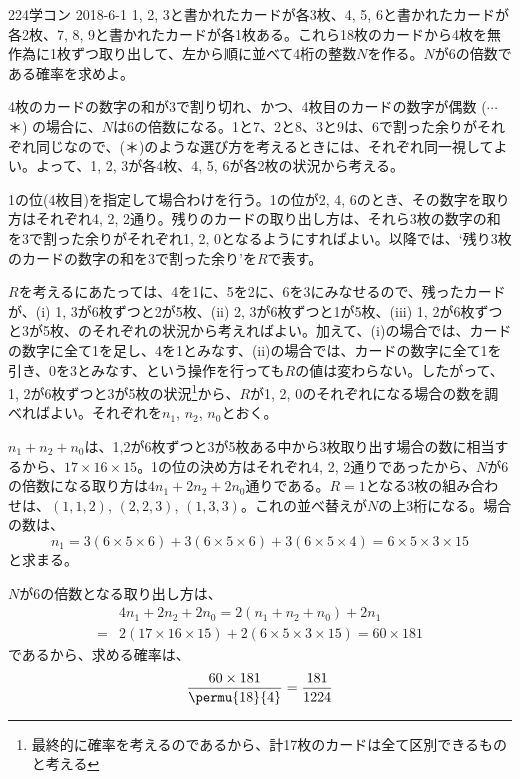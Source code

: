 \begin{prob}{224}{\maru}{学コン 2018-6-1}
 1, 2, 3と書かれたカードが各3枚、4, 5, 6と書かれたカードが各2枚、7, 8, 9と書かれたカードが各1枚ある。これら18枚のカードから4枚を無作為に1枚ずつ取り出して、左から順に並べて4桁の整数$N$を作る。$N$が6の倍数である確率を求めよ。
\end{prob}
4枚のカードの数字の和が3で割り切れ、かつ、4枚目のカードの数字が偶数 ($\cdots$ ＊) の場合に、$N$は6の倍数になる。1と7、2と8、3と9は、6で割った余りがそれぞれ同じなので、(＊)のような選び方を考えるときには、それぞれ同一視してよい。よって、1, 2, 3が各4枚、4, 5, 6が各2枚の状況から考える。

1の位(4枚目)を指定して場合わけを行う。1の位が2, 4, 6のとき、その数字を取り方はそれぞれ4, 2, 2通り。残りのカードの取り出し方は、それら3枚の数字の和を3で割った余りがそれぞれ1, 2, 0となるようにすればよい。以降では、`残り3枚のカードの数字の和を3で割った余り'を$R$で表す。

$R$を考えるにあたっては、4を1に、5を2に、6を3にみなせるので、残ったカードが、(i) 1, 3が6枚ずつと2が5枚、(ii) 2, 3が6枚ずつと1が5枚、(iii) 1, 2が6枚ずつと3が5枚、のそれぞれの状況から考えればよい。加えて、(i)の場合では、カードの数字に全て1を足し、4を1とみなす、(ii)の場合では、カードの数字に全て1を引き、0を3とみなす、という操作を行っても$R$の値は変わらない。したがって、1, 2が6枚ずつと3が5枚の状況\footnote{最終的に確率を考えるのであるから、計17枚のカードは全て区別できるものと考える}から、$R$が1, 2, 0のそれぞれになる場合の数を調べればよい。それぞれを$n_1$, $n_2$, $n_0$とおく。

$n_1+n_2+n_0$は、1,2が6枚ずつと3が5枚ある中から3枚取り出す場合の数に相当するから、$17\times 16\times 15$。1の位の決め方はそれぞれ4, 2, 2通りであったから、$N$が6の倍数になる取り方は$4n_1+2n_2+2n_0$通りである。$R=1$となる3枚の組み合わせは、$(1, 1, 2)$, $(2, 2, 3)$, $(1, 3, 3)$。これの並べ替えが$N$の上3桁になる。場合の数は、
\[ n_1=3(6\times 5\times 6)+3(6\times 5\times 6)+3(6\times 5\times 4)=6\times 5\times 3\times 15 \]
と求まる。

$N$が6の倍数となる取り出し方は、
\begin{align*}
 &4n_1+2n_2+2n_0=2(n_1+n_2+n_0)+2n_1 \\
 =&2(17\times 16\times 15) + 2(6\times 5\times 3\times 15) = 60\times 181
\end{align*}
であるから、求める確率は、
\[ \frac{60\times 181}{\permu{18}{4}}=\frac{181}{1224} \]